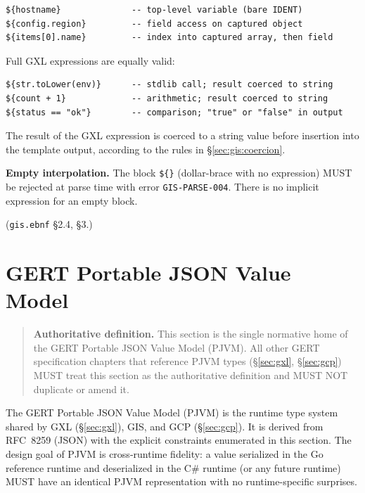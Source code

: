 \begin{verbatim}
${hostname}              -- top-level variable (bare IDENT)
${config.region}         -- field access on captured object
${items[0].name}         -- index into captured array, then field
\end{verbatim}

Full GXL expressions are equally valid:

\begin{verbatim}
${str.toLower(env)}      -- stdlib call; result coerced to string
${count + 1}             -- arithmetic; result coerced to string
${status == "ok"}        -- comparison; "true" or "false" in output
\end{verbatim}

The result of the GXL expression is coerced to a string value before
insertion into the template output, according to the rules in
\S\ref{sec:gis:coercion}.

\noindent\textbf{Empty interpolation.}
The block \texttt{\$\{\}} (dollar-brace with no expression) MUST be
rejected at parse time with error \texttt{GIS-PARSE-004}.
There is no implicit expression for an empty block.

(\texttt{gis.ebnf} \S2.4, \S3.)

\section{GERT Portable JSON Value Model}
\label{sec:gis:portable-json}

\begin{quote}
\noindent\textbf{Authoritative definition.}
This section is the single normative home of the GERT Portable JSON Value
Model (PJVM).
All other GERT specification chapters that reference PJVM types
(\S\ref{sec:gxl}, \S\ref{sec:gcp}) MUST treat this section as the
authoritative definition and MUST NOT duplicate or amend it.
\end{quote}

The GERT Portable JSON Value Model (PJVM) is the runtime type system
shared by GXL (\S\ref{sec:gxl}), GIS, and GCP (\S\ref{sec:gcp}).
It is derived from RFC~8259 (JSON) with the explicit constraints
enumerated in this section.
The design goal of PJVM is cross-runtime fidelity: a value serialized
in the Go reference runtime and deserialized in the C\# runtime (or any
future runtime) MUST have an identical PJVM representation with no
runtime-specific surprises.

